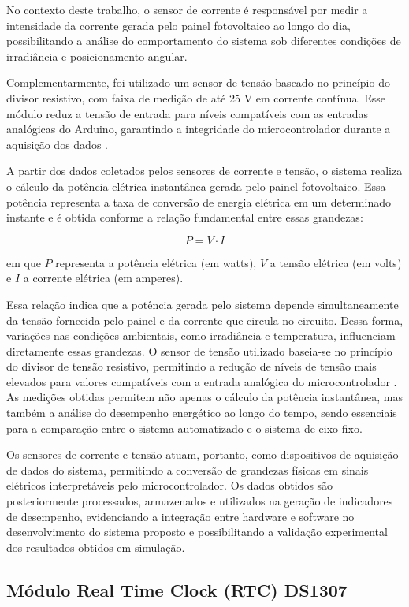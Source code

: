 No contexto deste trabalho, o sensor de corrente é responsável por medir a intensidade da corrente gerada pelo painel fotovoltaico ao longo do dia, possibilitando a análise do comportamento do sistema sob diferentes condições de irradiância e posicionamento angular.

Complementarmente, foi utilizado um sensor de tensão baseado no princípio do divisor resistivo, com faixa de medição de até 25 V em corrente contínua. Esse módulo reduz a tensão de entrada para níveis compatíveis com as entradas analógicas do Arduino, garantindo a integridade do microcontrolador durante a aquisição dos dados \cite{usinainfo2024}.

A partir dos dados coletados pelos sensores de corrente e tensão, o sistema realiza o cálculo da potência elétrica instantânea gerada pelo painel fotovoltaico. Essa potência representa a taxa de conversão de energia elétrica em um determinado instante e é obtida conforme a relação fundamental entre essas grandezas:

\[
P = V \cdot I
\]

em que \(P\) representa a potência elétrica (em watts), \(V\) a tensão elétrica (em volts) e \(I\) a corrente elétrica (em amperes).

Essa relação indica que a potência gerada pelo sistema depende simultaneamente da tensão fornecida pelo painel e da corrente que circula no circuito. Dessa forma, variações nas condições ambientais, como irradiância e temperatura, influenciam diretamente essas grandezas. O sensor de tensão utilizado baseia-se no princípio do divisor de tensão resistivo, permitindo a redução de níveis de tensão mais elevados para valores compatíveis com a entrada analógica do microcontrolador \cite{sedra2016}. As medições obtidas permitem não apenas o cálculo da potência instantânea, mas também a análise do desempenho energético ao longo do tempo, sendo essenciais para a comparação entre o sistema automatizado e o sistema de eixo fixo.

Os sensores de corrente e tensão atuam, portanto, como dispositivos de aquisição de dados do sistema, permitindo a conversão de grandezas físicas em sinais elétricos interpretáveis pelo microcontrolador. Os dados obtidos são posteriormente processados, armazenados e utilizados na geração de indicadores de desempenho, evidenciando a integração entre hardware e software no desenvolvimento do sistema proposto e possibilitando a validação experimental dos resultados obtidos em simulação.

\subsection{Módulo Real Time Clock (RTC) DS1307}

